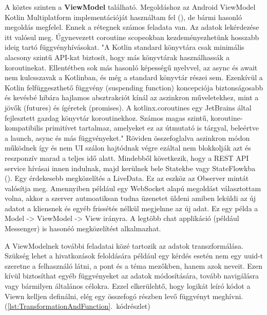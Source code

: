 A köztes szinten a \textbf{ViewModel} található.
Megoldáshoz az Android ViewModel Kotlin Multiplatform implementációját használtam fel (), de bármi hasonló megoldás megfelel.
Ennek a rétegnek számos feladata van.
Az adatok lekérdezése itt valósul meg. Úgynevezett coroutine scopeokban kezdeményezhetünk hosszabb ideig tartó függvényhívásokat. 
"A Kotlin standard könyvtára csak minimális alacsony szintű API-kat biztosít, hogy más könyvtárak használhassák a koroutinekat. Ellentétben sok más hasonló képességű nyelvvel, az async és await nem kulcsszavak a Kotlinban, és még a standard könyvtár részei sem. Ezenkívül a Kotlin felfüggeszthető függvény (suspending function) koncepciója biztonságosabb és kevésbé hibára hajlamos absztrakciót kínál az aszinkron műveletekhez, mint a jövők (futures) és ígéretek (promises). A kotlinx.coroutines egy JetBrains által fejlesztett gazdag könyvtár koroutinekhoz. Számos magas szintű, koroutine-kompatibilis primitívet tartalmaz, amelyeket ez az útmutató is tárgyal, beleértve a launch, async és más függvényeket." \cite{Coroutine}
Röviden összefoglalva aszinkron módon működnek így és nem UI szálon hajtódnak végre ezáltal nem blokkolják azt és reszponzív marad a teljes idő alatt.
Mindebből következik, hogy a REST API service hívásai innen indulnak, majd kerülnek bele Statekbe vagy StateFlowkba ().
Egy érdekesebb megközelítés a LiveData. Ez az eszköz az Observer mintát valósítja meg. Amennyiben például egy WebSocket alapú megoldást választottam volna, akkor a szerver autmoatiksan tudna üzenetet üldeni amiben leküldi az új adatot a kliensnek és egyéb frissétés nélkül megjelnne az új adat. Ez egy példa a Model -> ViewModel -> View irányra. A legtöbb chat applikáció (például Messenger) is hasonéó megközelítést alkalmazhat.

A ViewModelnek további feladatai közé tartozik az adatok transzformálása.
Szükség lehet a hivatkozások feloldására például egy kérdés esetén nem egy uuid-t szeretne a felhasználó látni, a pont és a téma mezőkben, hanem azok neveit.
Ezen kívül biztosíthat egyéb függvényeket az adatok módosítására, tovább navigálásra vagy bármilyen általános célokra.
Ezzel elkerülehtő, hogy logikát leíró kódot a Viewn kelljen definálni, elég egy összefogó részben levő függvényt meghívni. (\ref{lst:TransformationAndFunction}.~kódrészlet)

